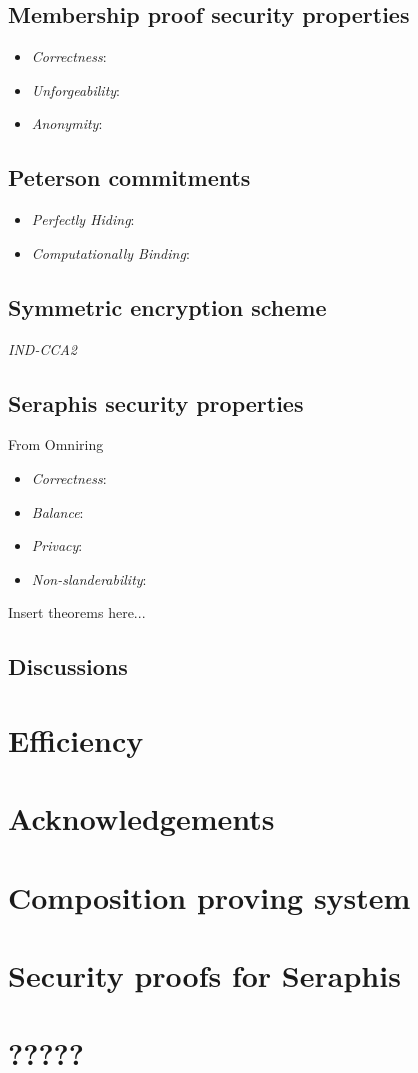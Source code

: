 \documentclass{article}
\begin{document}
\subsection{Membership proof security properties}
\begin{itemize}
    \item \textit{Correctness}:
    \item \textit{Unforgeability}:
    \item \textit{Anonymity}:
\end{itemize}
\subsection{Peterson commitments}
\begin{itemize}
    \item \textit{Perfectly Hiding}:
    \item \textit{Computationally Binding}:
\end{itemize}
\subsection{Symmetric encryption scheme}\label{Symm}
\noindent \textit{IND-CCA2}
\subsection{Seraphis security properties}\label{sec-thm}
\noindent From Omniring
\begin{itemize}
    \item \textit{Correctness}:
    \item \textit{Balance}:
    \item \textit{Privacy}:
    \item \textit{Non-slanderability}:
\end{itemize}
\noindent Insert theorems here...
\subsection{Discussions}\label{sec-disc}

\section{Efficiency}

\section*{Acknowledgements}




\appendix
\section{Composition proving system}
\section{Security proofs for Seraphis}
\section{?????}
\end{document}
